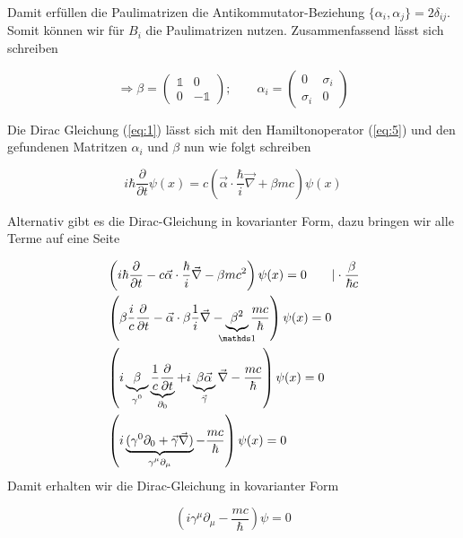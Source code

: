 Damit erfüllen die Paulimatrizen die Antikommutator-Beziehung  \(\{\alpha_i,\alpha_j\} =2\delta_{ij} \). Somit können wir für \(B_i\) die Paulimatrizen nutzen. Zusammenfassend lässt sich schreiben

\begin{equation}
  \label{eq:15}
  \Rightarrow \boxed{ \beta= \begin{pmatrix}\mathbb 1&0\\ 0&-\mathbb 1\end{pmatrix};\qquad \alpha_i=\begin{pmatrix} 0&\sigma_i\\ \sigma_i&0\end{pmatrix} }
\end{equation}


Die Dirac Gleichung (\ref{eq:1}) lässt sich mit den Hamiltonoperator (\ref{eq:5}) und den gefundenen Matritzen \(\alpha_i\) und \(\beta\) nun wie folgt schreiben

\begin{equation}
  \label{eq:16}
  \boxed{i\hbar \frac{\partial}{\partial t}\psi(x) = c\left(\vec \alpha\cdot\frac{\hbar}{i}\vec \nabla + \beta mc\right)\psi(x)}
\end{equation}


Alternativ gibt es die Dirac-Gleichung in kovarianter Form, dazu bringen wir alle Terme auf eine Seite


\begin{align}
  \label{eq:20}
  &\left( i\hbar \frac{\partial}{\partial t} - c \vec \alpha\cdot\frac{\hbar}{i}\vec \nabla - \beta mc^2 \right)\psi(x) = 0 \qquad |\cdot \frac{\beta}{\hbar c} \notag \\
 &\left( \beta\frac{i}{c} \frac{\partial}{\partial t} - \vec\alpha\cdot\beta\frac{1}{i}\vec \nabla  - \underbr{\beta^2}_{\mathds 1} \frac{mc}{\hbar } \right)\psi(x) = 0 \notag\\
 &\left( i \underbr{ \beta}_{\gamma^0}  \underbr{ \frac{1}{c} \frac{\partial}{\partial t}}_{\partial_0} + i\underbr{ \beta \vec \alpha }_{\vec \gamma}\vec \nabla -  \frac{mc}{\hbar } \right)\psi(x) = 0 \notag\\
 &\left( i \underbr{(\gamma^0  \partial_0 + \vec \gamma \vec \nabla)}_{\gamma^\mu\partial_\mu} -  \frac{mc}{\hbar } \right)\psi(x) = 0 \notag\\
\end{align}
Damit erhalten wir die Dirac-Gleichung in kovarianter Form

\begin{equation}
  \label{eq:17}
  \boxed{\left(i\gamma^\mu\partial_\mu - \frac{mc}{\hbar}\right)\psi=0}
\end{equation}


